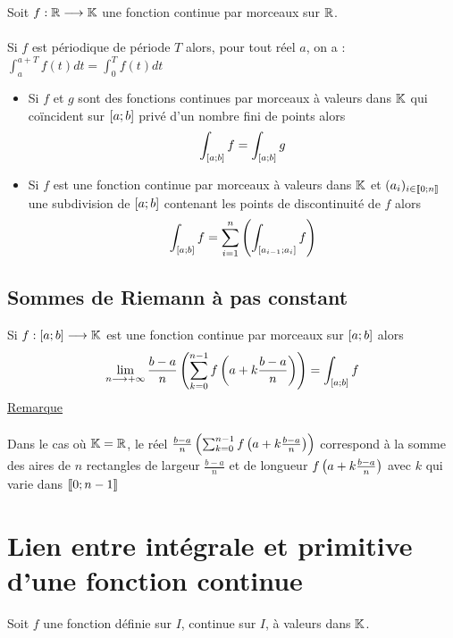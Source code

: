\begin{defprop}
    Soit \(f : \mathbb{R} \longrightarrow \mathbb{K}\) une fonction continue par morceaux sur \(\mathbb{R}\).\\~\\
    Si \(f\) est périodique de période \(T\) alors, pour tout réel \(a\), on a : \(\int^{a+T}_a f (t) dt = \int^T_0 f (t) dt\)
\end{defprop}
\begin{defprop}
   \begin{itemize}
        \item Si \(f\) et \(g\) sont des fonctions continues par morceaux à valeurs dans \(\mathbb{K}\) qui coïncident sur \(\left[a;b\right]\) privé d’un nombre fini de points alors
        \[\int_{\left[a;b\right]} f = \int_{\left[a;b\right]} g\]
        \item Si \(f\) est une fonction continue par morceaux à valeurs dans \(\mathbb{K}\) et \((a_i)_{i\in \left\llbracket0;n\right\rrbracket}\) une subdivision de \(\left[a;b\right]\) contenant les points de discontinuité de \(f\) alors
        \[\int_{\left[a;b\right]} f = \sum^n_{i=1} \left(\int_{\left[a_{i- 1};a_i\right]} f \right)\]
   \end{itemize}
\end{defprop}
\subsection{Sommes de Riemann à pas constant}
\begin{defprop}
    Si \(f : \left[a;b\right] \longrightarrow \mathbb{K}\) est une fonction continue par morceaux sur \(\left[a;b\right]\) alors
    \[\lim_{n\longrightarrow+\infty} \frac{b -  a}{n} \left(\sum^{n- 1}_{k=0} f \left(a + k \frac{b -  a}{n}\right)\right) = \int_{\left[a;b\right]} f \]
    \underline{Remarque} \\~\\
    Dans le cas où \(\mathbb{K} = \mathbb{R}\), le réel \(\frac{b -  a}{n} \left(\sum^{n- 1}_{k=0} f \left(a + k \frac{b -  a}{n}\right)\right)\) correspond à la somme des aires de \(n\) rectangles de largeur \(\frac{b - a}{n}\) et de longueur \(f\left(a + k \frac{b -  a}{n}\right)\) avec \(k\) qui varie dans \(\left\llbracket0;n -  1\right\rrbracket\)
\end{defprop}
\section{Lien entre intégrale et primitive d’une fonction continue}
    Soit \(f\) une fonction définie sur \(I\), continue sur \(I\), à valeurs dans \(\mathbb{K}\).
